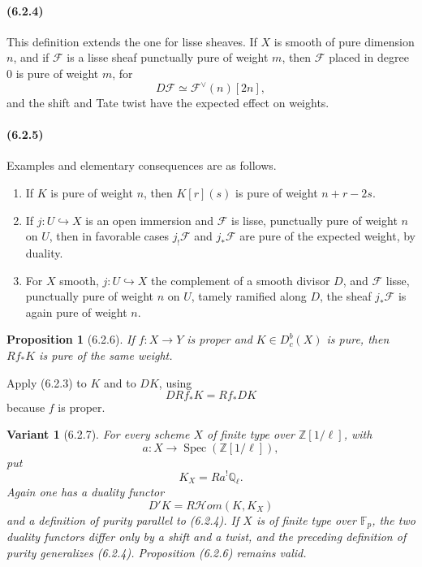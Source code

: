 \documentclass[11pt]{article}
\newtheorem{proposition}{Proposition}
\newtheorem{variant}{Variant}
\theoremstyle{remark}
\newcommand{\Ql}{\mathbb{Q}_\ell}
\newcommand{\ZZ}{\mathbb{Z}}
\begin{document}
\paragraph{(6.2.4)}
This definition extends the one for lisse sheaves.  If \(X\) is smooth of pure dimension \(n\), and if \(\mathcal F\) is a lisse sheaf punctually pure of weight \(m\), then \(\mathcal F\) placed in degree \(0\) is pure of weight \(m\), for
\[
D\mathcal F\simeq \mathcal F^\vee(n)[2n],
\]
and the shift and Tate twist have the expected effect on weights.

\paragraph{(6.2.5)}
Examples and elementary consequences are as follows.
\begin{enumerate}[label=\alph*)]
\item If \(K\) is pure of weight \(n\), then \(K[r](s)\) is pure of weight \(n+r-2s\).
\item If \(j:U\hookrightarrow X\) is an open immersion and \(\mathcal F\) is lisse, punctually pure of weight \(n\) on \(U\), then in favorable cases \(j_!\mathcal F\) and \(j_*\mathcal F\) are pure of the expected weight, by duality.
\item For \(X\) smooth, \(j:U\hookrightarrow X\) the complement of a smooth divisor \(D\), and \(\mathcal F\) lisse, punctually pure of weight \(n\) on \(U\), tamely ramified along \(D\), the sheaf \(j_*\mathcal F\) is again pure of weight \(n\).
\end{enumerate}

\begin{proposition}[6.2.6]
If \(f:X\to Y\) is proper and \(K\in D^b_c(X)\) is pure, then \(Rf_*K\) is pure of the same weight.
\end{proposition}

Apply (6.2.3) to \(K\) and to \(DK\), using
\[
DRf_*K=Rf_*DK
\]
because \(f\) is proper.

\begin{variant}[6.2.7]
For every scheme \(X\) of finite type over \(\ZZ[1/\ell]\), with
\[
a:X\longrightarrow \operatorname{Spec}(\ZZ[1/\ell]),
\]
put
\[
K_X=Ra^!\Ql.
\]
Again one has a duality functor
\[
D'K=R\mathcal Hom(K,K_X)
\]
and a definition of purity parallel to (6.2.4).  If \(X\) is of finite type over \(\mathbb F_p\), the two duality functors differ only by a shift and a twist, and the preceding definition of purity generalizes (6.2.4).  Proposition (6.2.6) remains valid.
\end{variant}
\end{document}
